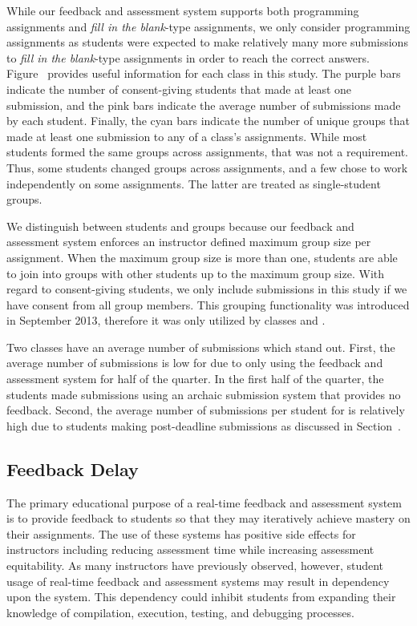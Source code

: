 While our feedback and assessment system supports both programming assignments
and \emph{fill in the blank}-type assignments, we only consider programming
assignments as students were expected to make relatively many more submissions
to \emph{fill in the blank}-type assignments in order to reach the correct
answers. Figure~ provides useful information for each
class in this study. The purple bars indicate the number of consent-giving
students that made at least one submission, and the pink bars indicate the
average number of submissions made by each student. Finally, the cyan bars
indicate the number of unique groups that made at least one submission to any
of a class's assignments. While most students formed the same groups across
assignments, that was not a requirement. Thus, some students changed groups
across assignments, and a few chose to work independently on some
assignments. The latter are treated as single-student groups.

We distinguish between students and groups because our feedback and assessment
system enforces an instructor defined maximum group size per assignment. When
the maximum group size is more than one, students are able to join into groups
with other students up to the maximum group size. With regard to consent-giving
students, we only include submissions in this study if we have consent from all
group members. This grouping functionality was introduced in September 2013,
therefore it was only utilized by classes  and .

Two classes have an average number of submissions which stand out. First, the
average number of submissions is low for  due to only using the
feedback and assessment system for half of the quarter. In the first half of
the quarter, the students made submissions using an archaic submission system
that provides no feedback. Second, the average number of submissions per
student for  is relatively high due to students making post-deadline
submissions as discussed in Section~.


\subsection{Feedback Delay} 
The primary educational purpose of a real-time feedback and assessment system
is to provide feedback to students so that they may iteratively achieve mastery
on their assignments. The use of these systems has positive side effects for
instructors including reducing assessment time while increasing assessment
equitability. As many instructors have previously observed, however, student
usage of real-time feedback and assessment systems may result in dependency
upon the system. This dependency could inhibit students from expanding their
knowledge of compilation, execution, testing, and debugging processes.

